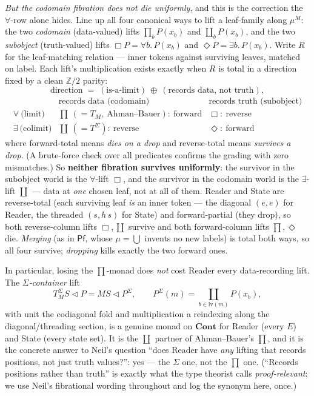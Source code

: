 \documentclass[11pt,a4paper]{book}
\newcommand{\Cont}{\mathbf{Cont}}
\newcommand{\cont}[2]{#1 \triangleleft #2}
\theoremstyle{plain}
\theoremstyle{definition}
\theoremstyle{remark}
\begin{document}
\begin{teachbox}
\emph{But the codomain fibration does not die uniformly}, and this is the correction the $\forall$-row
alone hides. Line up all four canonical ways to lift a leaf-family along $\mu^{M}$: the two \emph{codomain}
(data-valued) lifts $\prod_{b}P(x_{b})$ and $\coprod_{b}P(x_{b})$, and the two \emph{subobject}
(truth-valued) lifts $\Box P=\forall b.\,P(x_{b})$ and $\Diamond P=\exists b.\,P(x_{b})$. Write $R$ for the
leaf-matching relation --- inner tokens against surviving leaves, matched on label. Each lift's
multiplication exists exactly when $R$ is total in a direction fixed by a clean $\mathbb Z/2$ parity:
\[
  \text{direction}\;=\;(\text{is-a-limit})\ \oplus\ (\text{records data, not truth}),
\]
\[
\renewcommand{\arraystretch}{1.3}
\begin{array}{r|cc}
 & \text{records data (codomain)} & \text{records truth (subobject)}\\\hline
\forall\ \text{(limit)}   & \prod\ (=T_{M},\ \text{Ahman--Bauer}):\ \text{forward} & \Box:\ \text{reverse}\\
\exists\ \text{(colimit)} & \coprod\ (=T^{\Sigma}):\ \text{reverse}                & \Diamond:\ \text{forward}
\end{array}
\]
where forward-total means \emph{dies on a drop} and reverse-total means \emph{survives a drop}. (A
brute-force check over all predicates confirms the grading with zero mismatches.) So \textbf{neither
fibration survives uniformly}: the survivor in the subobject world is the $\forall$-lift $\Box$, and the
survivor in the codomain world is the $\exists$-lift $\coprod$ --- data at \emph{one} chosen leaf, not at
all of them. Reader and State are reverse-total (each surviving leaf \emph{is} an inner token --- the
diagonal $(e,e)$ for Reader, the threaded $(s,h\,s)$ for State) and forward-partial (they drop), so both
reverse-column lifts $\Box,\coprod$ survive and both forward-column lifts $\prod,\Diamond$ die.
\emph{Merging} (as in $\mathsf{Pf}$, whose $\mu=\bigcup$ invents no new labels) is total both ways, so all
four survive; \emph{dropping} kills exactly the two forward ones.

In particular, losing the $\prod$-monad does \emph{not} cost Reader every data-recording lift. The
\emph{$\Sigma$-container} lift
\[
  T^{\Sigma}_{M}\cont SP=\cont{MS}{P^{\Sigma}},\qquad P^{\Sigma}(m)=\coprod_{b\in\mathrm{lv}(m)}P(x_{b}),
\]
with unit the codiagonal fold and multiplication a reindexing along the diagonal/threading section, is a
genuine monad on $\Cont$ for Reader (every $E$) and State (every state set). It is the $\coprod$ partner of
Ahman--Bauer's $\prod$, and it is the concrete answer to Neil's question ``does Reader have \emph{any}
lifting that records positions, not just truth values?'': yes --- the $\Sigma$ one, not the $\prod$ one.
(``Records positions rather than truth'' is exactly what the type theorist calls
\emph{proof-relevant}; we use Neil's fibrational wording throughout and log the synonym here, once.)


\end{teachbox}
\end{document}
